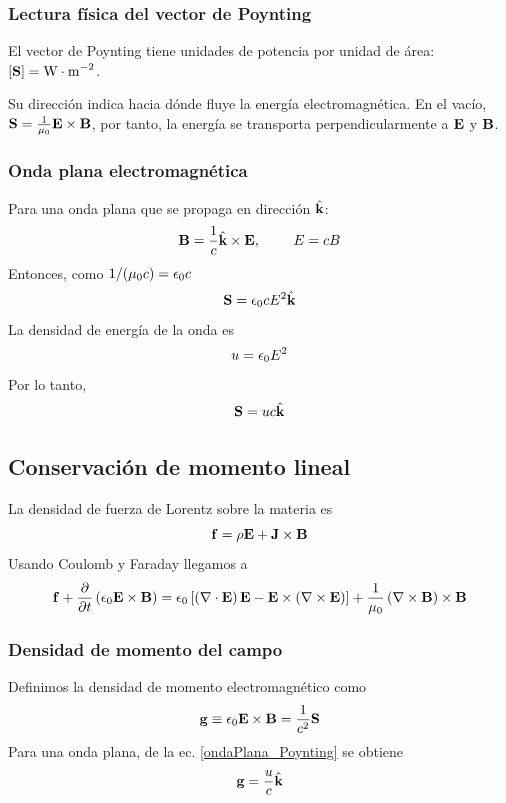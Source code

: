 \documentclass[]{article}
\numberwithin{equation}{section}
\begin{document}
\subsubsection{Lectura física del vector de Poynting}
El vector de Poynting tiene unidades de potencia por unidad de área: \([\mathbf{S}] = \mathrm{W\cdot m}^{-2}\).

Su dirección indica hacia dónde fluye la energía electromagnética. En el vacío, \(\mathbf{S} = \frac{1}{\mu_{0}} \mathbf{E}\times\mathbf{B}\), por tanto, la energía se transporta perpendicularmente a \(\mathbf{E}\) y \(\mathbf{B}\).

\subsubsection{Onda plana electromagnética}
Para una onda plana que se propaga en dirección \(\hat{\mathbf{k}}\):
\begin{equation*}
	\mathbf{B} = \frac{1}{c} \hat{\mathbf{k}}\times\mathbf{E}, ~~~~~~~ E = c B
\end{equation*}
Entonces, como \(1/(\mu_{0} c) = \epsilon_{0} c\)
\begin{equation*}
	\mathbf{S} = \epsilon_{0} c E^2 \hat{\mathbf{k}}
\end{equation*}
La densidad de energía de la onda es
\begin{equation*}
	u = \epsilon_{0} E^2
\end{equation*}
Por lo tanto,
\begin{equation}
	\mathbf{S} = u c \hat{\mathbf{k}} \label{ondaPlana_Poynting}
\end{equation}

\subsection{Conservación de momento lineal}
La densidad de fuerza de Lorentz sobre la materia es
\begin{equation}
	\mathbf{f} = \rho\mathbf{E} + \mathbf{J}\times\mathbf{B}
\end{equation}
Usando Coulomb y Faraday llegamos a
\begin{equation}
	\mathbf{f} + \dfrac{\partial }{\partial t} \left(\epsilon_{0}\mathbf{E}\times\mathbf{B}\right) = \epsilon_{0}\left[\left(\nabla\cdot\mathbf{E}\right)\mathbf{E} - \mathbf{E}\times\left(\nabla\times\mathbf{E}\right)\right] + \frac{1}{\mu_{0}} \left(\nabla\times\mathbf{B}\right)\times\mathbf{B}
\end{equation}

\subsubsection{Densidad de momento del campo}
Definimos la densidad de momento electromagnético como
\begin{equation}
	\mathbf{g} \equiv \epsilon_{0} \mathbf{E}\times\mathbf{B} = \frac{1}{c^2} \mathbf{S}
\end{equation}
Para una onda plana, de la ec. \ref{ondaPlana_Poynting} se obtiene
\begin{equation}
	\mathbf{g} = \frac{u}{c} \hat{\mathbf{k}}
\end{equation}
\end{document}
